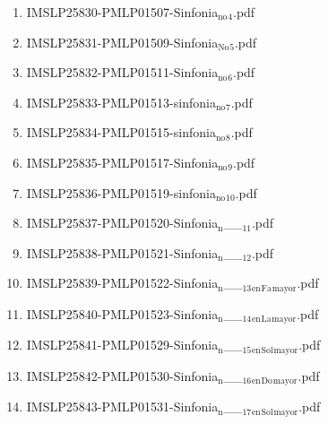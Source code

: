 \documentclass[11pt]{article}
\begin{document}
\begin{enumerate}
\begin{enumerate}
\item IMSLP25830-PMLP01507-Sinfonia$_{\text{no}}$$_{\text{4}}$.pdf
\label{sec-1-1-1-1-44-49-11-5}

\item IMSLP25831-PMLP01509-Sinfonia$_{\text{No}}$$_{\text{5}}$.pdf
\label{sec-1-1-1-1-44-49-11-6}

\item IMSLP25832-PMLP01511-Sinfonia$_{\text{no}}$$_{\text{6}}$.pdf
\label{sec-1-1-1-1-44-49-11-7}

\item IMSLP25833-PMLP01513-sinfonia$_{\text{no}}$$_{\text{7}}$.pdf
\label{sec-1-1-1-1-44-49-11-8}

\item IMSLP25834-PMLP01515-sinfonia$_{\text{no}}$$_{\text{8}}$.pdf
\label{sec-1-1-1-1-44-49-11-9}

\item IMSLP25835-PMLP01517-Sinfonia$_{\text{no}}$$_{\text{9}}$.pdf
\label{sec-1-1-1-1-44-49-11-10}

\item IMSLP25836-PMLP01519-sinfonia$_{\text{no}}$$_{\text{10}}$.pdf
\label{sec-1-1-1-1-44-49-11-11}

\item IMSLP25837-PMLP01520-Sinfonia$_{\text{n}}$\_\_$_{\text{11}}$.pdf
\label{sec-1-1-1-1-44-49-11-12}

\item IMSLP25838-PMLP01521-Sinfonia$_{\text{n}}$\_\_$_{\text{12}}$.pdf
\label{sec-1-1-1-1-44-49-11-13}

\item IMSLP25839-PMLP01522-Sinfonia$_{\text{n}}$\_\_$_{\text{13}}$$_{\text{en}}$$_{\text{Fa}}$$_{\text{mayor}}$.pdf
\label{sec-1-1-1-1-44-49-11-14}

\item IMSLP25840-PMLP01523-Sinfonia$_{\text{n}}$\_\_$_{\text{14}}$$_{\text{en}}$$_{\text{La}}$$_{\text{mayor}}$.pdf
\label{sec-1-1-1-1-44-49-11-15}

\item IMSLP25841-PMLP01529-Sinfonia$_{\text{n}}$\_\_$_{\text{15}}$$_{\text{en}}$$_{\text{Sol}}$$_{\text{mayor}}$.pdf
\label{sec-1-1-1-1-44-49-11-16}

\item IMSLP25842-PMLP01530-Sinfonia$_{\text{n}}$\_\_$_{\text{16}}$$_{\text{en}}$$_{\text{Do}}$$_{\text{mayor}}$.pdf
\label{sec-1-1-1-1-44-49-11-17}

\item IMSLP25843-PMLP01531-Sinfonia$_{\text{n}}$\_\_$_{\text{17}}$$_{\text{en}}$$_{\text{Sol}}$$_{\text{mayor}}$.pdf
\label{sec-1-1-1-1-44-49-11-18}


\end{enumerate}
\end{enumerate}
\end{document}
